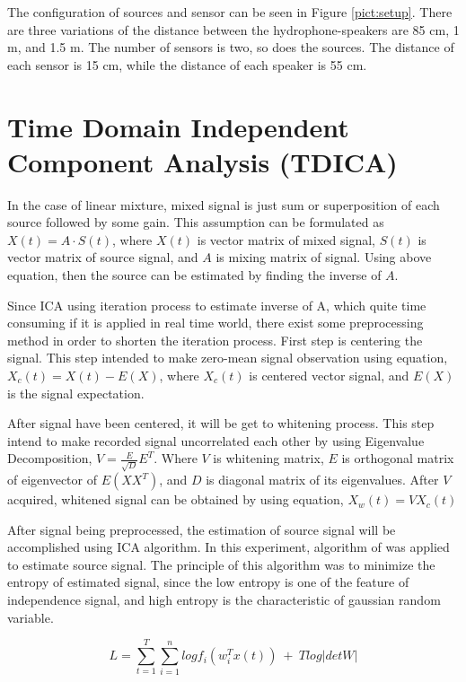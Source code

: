 \documentclass[a4paper]{jpconf}
\begin{document}
The configuration of sources and sensor can be seen in Figure \ref{pict:setup}. There are three variations of the distance between the hydrophone-speakers are 85 cm, 1 m, and 1.5 m. The number of sensors is two, so does the sources. The distance of each sensor is 15 cm, while the distance of each speaker is 55 cm.

\section{Time Domain Independent Component Analysis (TDICA)}
In the case of linear mixture, mixed signal is just sum or superposition of each source followed by some gain. This assumption can be formulated as $X(t)=A \cdot S(t)$, where $X(t)$ is vector matrix of mixed signal, $S(t)$ is vector matrix of source signal, and $A$ is mixing matrix of signal. Using above equation, then the source can be estimated by finding the inverse of $A$.

Since ICA using iteration process to estimate inverse of A, which quite time consuming if it is applied in real time world, there exist some preprocessing method in order to shorten the iteration process. First step is centering the signal. This step intended to make zero-mean signal observation using equation, $X_c(t) = X(t) - E(X)$, where $X_c(t)$ is centered vector signal, and $E(X)$ is the signal expectation.

After signal have been centered, it will be get to whitening process. This step intend to make recorded signal uncorrelated each other by using Eigenvalue Decomposition, $V = \frac{E}{\sqrt{D}}E^T$. Where $V$ is whitening matrix, $E$ is orthogonal matrix of eigenvector of $E(XX^T)$, and $D$ is diagonal matrix of its eigenvalues. After $V$ acquired, whitened signal can be obtained by using equation, $X_w(t) = V X_c(t)$

After signal being preprocessed, the estimation of source signal will be accomplished using ICA algorithm. In this experiment, algorithm of \cite{5} was applied to estimate source signal. The principle of this algorithm was to minimize the entropy of estimated signal, since the low entropy is one of the feature of independence signal, and high entropy is the characteristic of gaussian random variable.

\begin{equation}\label{pers:entropy}
L = \sum_{t=1}^T \sum_{i=1}^n log f_i \left(w_i^T x(t)\right) ~+~ T log |det W|
\end{equation}
\end{document}
